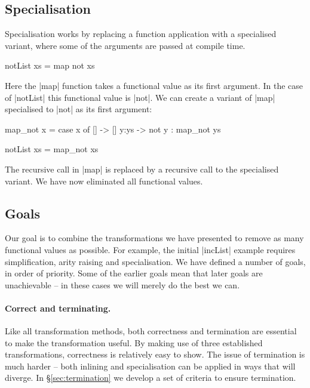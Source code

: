 \documentclass[preprint]{sigplanconf}
\begin{document}
\subsection{Specialisation}

Specialisation works by replacing a function application with a specialised variant, where some of the arguments are passed at compile time.

\begin{example}
\begin{code}
notList xs = map not xs
\end{code}

Here the |map| function takes a functional value as its first argument. In the case of |notList| this functional value is |not|. We can create a variant of |map| specialised to |not| as its first argument:

\begin{code}
map_not x = case  x of
                  []    -> []
                  y:ys  -> not y : map_not ys

notList xs = map_not xs
\end{code}

The recursive call in |map| is replaced by a recursive call to the specialised variant. We have now eliminated all functional values.
\end{example}

\subsection{Goals}
\label{sec:goals}

Our goal is to combine the transformations we have  presented to remove as many functional values as possible. For example, the initial |incList| example requires simplification, arity raising and specialisation. We have defined a number of goals, in order of priority. Some of the earlier goals mean that later goals are unachievable -- in these cases we will merely do the best we can.

\paragraph{Correct and terminating.} Like all transformation methods, both correctness and termination are essential to make the transformation useful. By making use of three established transformations, correctness is relatively easy to show. The issue of termination is much harder -- both inlining and specialisation can be applied in ways that will diverge. In \S\ref{sec:termination} we develop a set of criteria to ensure termination.
\end{document}

